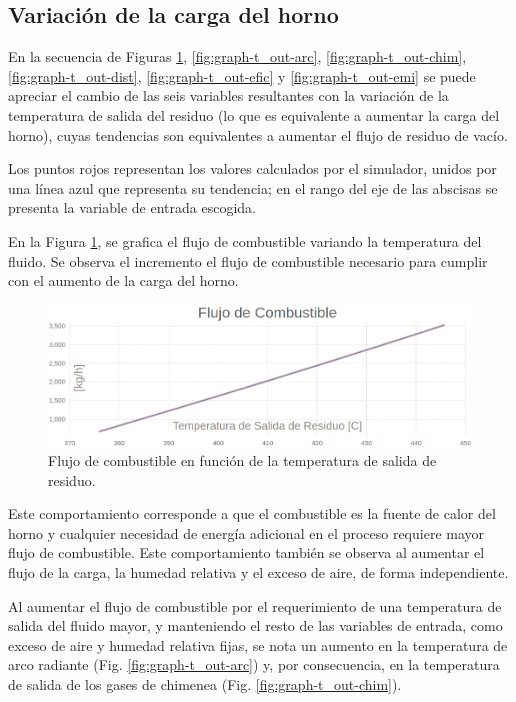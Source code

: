 \subsection{Variación de la carga del horno}
\par En la secuencia de Figuras \ref{fig:graph-t_out-fuel}, \ref{fig:graph-t_out-arc}, \ref{fig:graph-t_out-chim}, \ref{fig:graph-t_out-dist}, \ref{fig:graph-t_out-efic} y \ref{fig:graph-t_out-emi} se puede apreciar el cambio de las seis variables resultantes con la variación de la temperatura de salida del residuo (lo que es equivalente a aumentar la carga del horno), cuyas tendencias son equivalentes a aumentar el flujo de residuo de vacío.
\par Los puntos rojos representan los valores calculados por el simulador, unidos por una línea azul que representa su tendencia; en el rango del eje de las abscisas se presenta la variable de entrada escogida.
\par En la Figura \ref{fig:graph-t_out-fuel}, se grafica el flujo de combustible variando la temperatura del fluido. Se observa el incremento el flujo de combustible necesario para cumplir con el aumento de la carga del horno.
\begin{figure}[H]\begin{center}
\includegraphics[scale=0.46]{images/graph-t_out-fuel}
\caption[Flujo de combustible en función de Temperatura de salida de residuo]{Flujo de combustible en función de la temperatura de salida de residuo.}
\label{fig:graph-t_out-fuel}\end{center}\end{figure}
\par Este comportamiento corresponde a que el combustible es la fuente de calor del horno y cualquier necesidad de energía adicional en el proceso requiere mayor flujo de combustible. Este comportamiento también se observa al aumentar el flujo de la carga, la humedad relativa y el exceso de aire, de forma independiente.
\par Al aumentar el flujo de combustible por el requerimiento de una temperatura de salida del fluido mayor, y manteniendo el resto de las variables de entrada, como exceso de aire y humedad relativa fijas, se nota un aumento en la temperatura de arco radiante (Fig. \ref{fig:graph-t_out-arc}) y, por consecuencia, en la temperatura de salida de los gases de chimenea (Fig. \ref{fig:graph-t_out-chim}).
